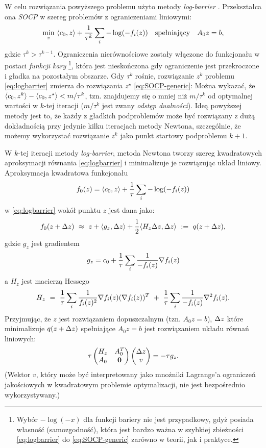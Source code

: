 W celu rozwiązania powyższego problemu użyto metody \textit{log-barrier} \cite{Boyd2004}. Przekształca ona \textit{SOCP} w szereg problemów z ograniczeniami liniowymi:
\begin{equation}
\label{eq:logbarrier} 
\min_z ~ \langle c_0,z\rangle + \frac{1}{\tau^k} \sum_{i}
-\log(-f_i(z)) \quad\text{spełniający}\quad A_0 z=b,
\end{equation}
gdzie $\tau^k > \tau^{k-1}$. Ograniczenia nierównościowe zostały włączone do funkcjonału w postaci \textit{funkcji kary} \footnote{Wybór $-\log(-x)$ dla funkcji bariery nie jest przypadkowy, gdyż posiada własność (samozgodność), która jest bardzo ważna w szybkiej zbieżności \eqref{eq:logbarrier} do \eqref{eq:SOCP-generic} zarówno w teorii, jak i praktyce.}, która jest nieskończona gdy ograniczenie jest przekroczone i gładka na pozostałym obszarze. Gdy $\tau^k$ rośnie, rozwiązanie $z^k$ problemu \eqref{eq:logbarrier} zmierza do rozwiązania $z^\star$  \eqref{eq:SOCP-generic}: 
Można wykazać, że $\langle c_0,z^k\rangle - \langle c_0,z^\star\rangle < m/\tau^k$, tzn. znajdujemy się o mniej niż $m/\tau^k$ od optymalnej wartości w $k$-tej iteracji ($m/\tau^k$ jest zwany {\em odstęp dualności}).
Ideą powyższej metody jest to, że każdy z gładkich podproblemów może być rozwiązany z dużą dokładnością przy jedynie kilku iteracjach metody Newtona, szczególnie, że możemy wykorzystać rozwiązanie $z^k$ jako punkt startowy podproblemu $k+1$.

W $k$-tej iteracji metody \textit{log-barrier}, metoda Newtona tworzy szereg kwadratowych aproksymacji równania \eqref{eq:logbarrier} i minimalizuje je rozwiązując układ liniowy. Aproksymacja kwadratowa funkcjonału
\[
f_0(z) = \langle c_0,z\rangle + \frac{1}{\tau}\sum_i -\log(-f_i(z))
\]
w \eqref{eq:logbarrier} wokół punktu $z$ jest dana jako:
\[
f_0(z+\Delta z) ~\approx~ z + \langle g_z,\Delta z\rangle + \frac{1}{2}\langle H_z \Delta z,\Delta z\rangle ~:=~ q(z+\Delta z),
\]
gdzie $g_z$ jest gradientem
\[
g_z = c_0 + \frac{1}{\tau}\sum_i \frac{1}{-f_i(z)}\nabla f_i(z)
\]
a $H_z$ jest macierzą Hessego
\[
H_z ~=~ \frac{1}{\tau}\sum_i \frac{1}{f_i(z)^2} \nabla f_i(z) (\nabla f_i(z))^T ~+ ~
\frac{1}{\tau}\sum_i \frac{1}{-f_i(z)}\nabla^2 f_i(z).
\]
Przyjmując, że $z$ jest rozwiązaniem dopuszczalnym (tzn. $A_0 z=b$),  $\Delta z$ które minimalizuje $q(z+\Delta z)$ spełniające $A_0 z=b$ jest rozwiązaniem układu równań liniowych:
\begin{equation}
\label{eq:lbnewton}
\tau \left(\begin{matrix} H_z & A_0^T \\ A_0 & \mathbf{0} \end{matrix}\right) \left(\begin{matrix} \Delta z \\ v \end{matrix}\right)= -\tau g_z.
\end{equation}
(Wektor $v$, który może być interpretowany jako mnożniki Lagrange'a ograniczeń jakościowych w kwadratowym problemie optymalizacji, nie jest bezpośrednio wykorzystywany.)

